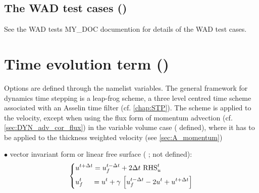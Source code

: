 \documentclass[../main/NEMO_manual]{subfiles}
\begin{document}
\subsection   [The WAD test cases (\textit{usrdef\_zgr})]
         {The WAD test cases ()}
\label{WAD_test_cases}

See the WAD tests MY\_DOC documention for details of the WAD test cases.



\section{Time evolution term (\protect{})}
\label{sec:DYN_nxt}



Options are defined through the  namelist variables.
The general framework for dynamics time stepping is a leap-frog scheme,
\ie a three level centred time scheme associated with an Asselin time filter (cf. \autoref{chap:STP}).
The scheme is applied to the velocity, except when
using the flux form of momentum advection (cf. \autoref{sec:DYN_adv_cor_flux})
in the variable volume case ( defined),
where it has to be applied to the thickness weighted velocity (see \autoref{sec:A_momentum})  

$\bullet$ vector invariant form or linear free surface
( ;  not defined):
\[
  \left\{
    \begin{aligned}
      &u^{t+\Delta t} = u_f^{t-\Delta t} + 2\Delta t  \ \text{RHS}_u^t  	\\
      &u_f^t \;\quad = u^t+\gamma \,\left[ {u_f^{t-\Delta t} -2u^t+u^{t+\Delta t}} \right]
    \end{aligned}
  \right.
\]
\end{document}
